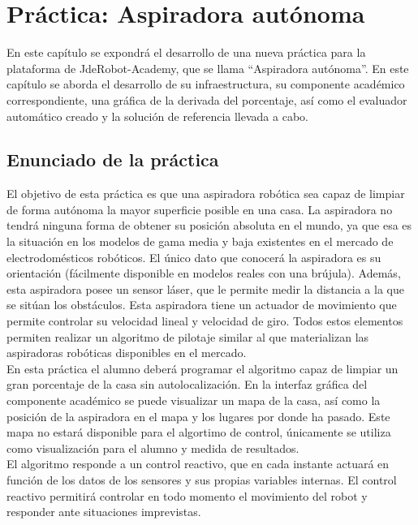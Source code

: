\chapter{Práctica: Aspiradora autónoma}\label{cap.roomba}
En este capítulo se expondrá el desarrollo de una nueva práctica para la plataforma de JdeRobot-Academy, que se llama ``Aspiradora autónoma''. En este capítulo se aborda el desarrollo de su infraestructura, su componente académico correspondiente, una gráfica de la derivada del porcentaje, así como el evaluador automático creado y la solución de referencia llevada a cabo. 

\section{Enunciado de la práctica} \label{sec.enunciado}
El objetivo de esta práctica es que una aspiradora robótica sea capaz de limpiar de forma autónoma la mayor superficie posible en una casa. La aspiradora no tendrá ninguna forma de obtener su posición absoluta en el mundo, ya que esa es la situación en los modelos
de gama media y baja existentes en el mercado de electrodomésticos robóticos. El único dato que conocerá la aspiradora es su orientación (fácilmente disponible en modelos reales con una brújula). Además, esta aspiradora posee un sensor láser, que le permite medir la distancia a la que se sitúan los obstáculos. Esta aspiradora tiene un actuador de movimiento que permite controlar su velocidad lineal y velocidad de giro. Todos estos elementos permiten realizar un algoritmo de pilotaje similar al que materializan las aspiradoras robóticas disponibles en el mercado.\\

En esta práctica el alumno deberá programar el algoritmo capaz de limpiar un gran porcentaje de la casa sin autolocalización. En la interfaz gráfica del componente académico se puede visualizar un mapa de la casa, así como la posición de la aspiradora en el mapa y los lugares por donde ha pasado. Este mapa no estará disponible para el algortimo de control, únicamente se utiliza como visualización para el alumno y medida de resultados.  \\

El algoritmo responde a un control reactivo, que en cada instante actuará en función de los datos de los sensores y sus propias variables internas. El control reactivo permitirá controlar en todo momento el movimiento del robot y responder ante situaciones imprevistas.

